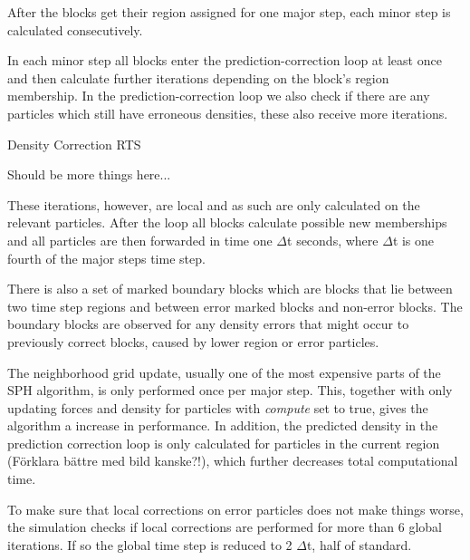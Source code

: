 \documentclass[../../main.tex]{subfiles}
\begin{document}
After the blocks get their region assigned for one major step, each minor step is calculated consecutively. 

In each minor step all blocks enter the prediction-correction loop at least once and then calculate further iterations depending on the block's region membership. In the prediction-correction loop we also check if there are any particles which still have erroneous densities, these also receive more iterations. 


\begin{algorithm}[h]
    \caption{Density Correction RTS}
    \label{alg:rts:pcisph}
    \begin{algorithmic}[1]
       \State Should be more things here...
   \end{algorithmic}
\end{algorithm}

These iterations, however, are local and as such are only calculated on the relevant particles. After the loop all blocks calculate possible new memberships and all particles are then forwarded in time one $\Delta$t seconds, where $\Delta$t is one fourth of the major steps time step. 

There is also a set of marked boundary blocks which are blocks that lie between two time step regions and between error marked blocks and non-error blocks. The boundary blocks are observed for any density errors that might occur to previously correct blocks, caused by lower region or error particles. 

The neighborhood grid update, usually one of the most expensive parts of the SPH algorithm, is only performed once per major step. This, together with only updating forces and density for particles with \textit{compute} set to true, gives the algorithm a increase in performance. In addition, the predicted density in the prediction correction loop is only calculated for particles in the current region (Förklara bättre med bild kanske?!), which further decreases total computational time. 

To make sure that local corrections on error particles does not make things worse, the simulation checks if local corrections are performed for more than 6 global iterations. If so the global time step is reduced to 2 $\Delta$t, half of standard.
\end{document}
